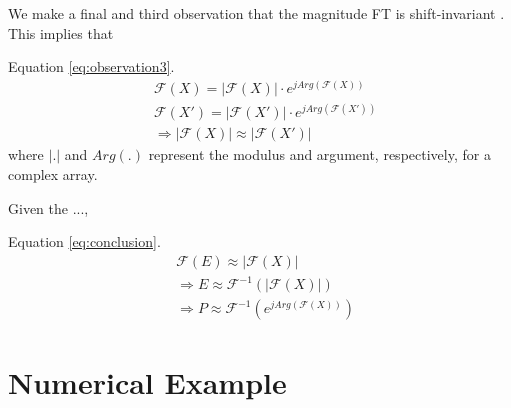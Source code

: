 \documentclass[journal]{IEEEtran}
\begin{document}
We make a final and third observation that the magnitude FT is shift-invariant \cite{proakis1995}. This implies that 

Equation \ref{eq:observation3}.
\begin{equation}
\label{eq:observation3}
\begin{split}
&\mathcal{F}(X) = |\mathcal{F}(X)| \cdot e^{j Arg(\mathcal{F}(X))} \\
&\mathcal{F}(X') = |\mathcal{F}(X')| \cdot e^{j Arg(\mathcal{F}(X'))} \\
&\Rightarrow |\mathcal{F}(X)| \approx |\mathcal{F}(X')|
\end{split}
\end{equation}
where $|.|$ and $Arg(.)$ represent the modulus and argument, respectively, for a complex array. 

Given the ..., 

Equation \ref{eq:conclusion}.
\begin{equation}
\label{eq:conclusion}
\begin{split}
&\mathcal{F}(E) \approx |\mathcal{F}(X)| \\
&\Rightarrow E \approx \mathcal{F}^{-1}(|\mathcal{F}(X)|) \\
&\Rightarrow P \approx \mathcal{F}^{-1}(e^{j Arg(\mathcal{F}(X))})
\end{split}
\end{equation}





\section{Numerical Example} %


\end{document}
